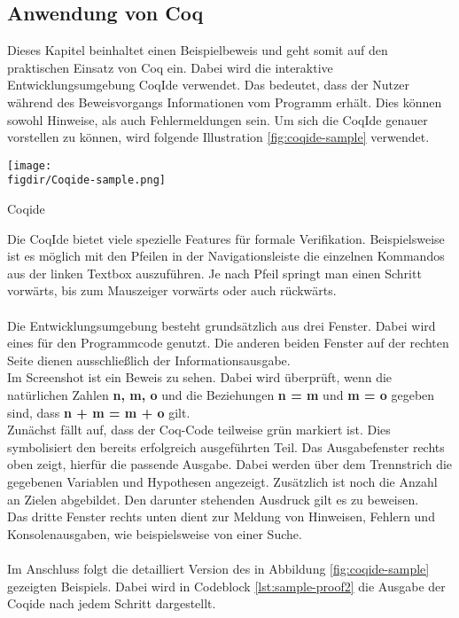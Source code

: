\subsection{Anwendung von Coq}
Dieses Kapitel beinhaltet einen Beispielbeweis und geht somit auf den praktischen Einsatz von Coq ein. Dabei wird die interaktive Entwicklungsumgebung CoqIde verwendet. Das bedeutet, dass der Nutzer während des Beweisvorgangs Informationen vom Programm erhält. Dies können sowohl Hinweise, als auch Fehlermeldungen sein. Um sich die CoqIde genauer vorstellen zu können, wird folgende Illustration \ref{fig:coqide-sample} verwendet.\\

\begin{minipage}{\textwidth}
	\centering
	\captionsetup{type=figure}
	\texttt{[image: \\figdir/Coqide-sample.png]}
	\caption{Coqide}
	\label{fig:coqide-sample}
\end{minipage}
Die CoqIde bietet viele spezielle Features für formale Verifikation. Beispielsweise ist es möglich mit den Pfeilen in der Navigationsleiste die einzelnen Kommandos aus der linken Textbox auszuführen. Je nach Pfeil springt man einen Schritt vorwärts, bis zum Mauszeiger vorwärts oder auch rückwärts.\\
\\
Die Entwicklungsumgebung besteht grundsätzlich aus drei Fenster. Dabei wird eines für den Programmcode genutzt. Die anderen beiden Fenster auf der rechten Seite dienen ausschließlich der Informationsausgabe.\\
Im Screenshot ist ein Beweis zu sehen. Dabei wird überprüft, wenn die natürlichen Zahlen \textbf{n, m, o} und die Beziehungen \textbf{n = m} und \textbf{m = o} gegeben sind, dass \textbf{n + m = m + o} gilt.\\
Zunächst fällt auf, dass der Coq-Code teilweise grün markiert ist. Dies symbolisiert den bereits erfolgreich ausgeführten Teil. Das Ausgabefenster rechts oben zeigt, hierfür die passende Ausgabe. Dabei werden über dem Trennstrich die gegebenen Variablen und Hypothesen angezeigt. Zusätzlich ist noch die Anzahl an Zielen abgebildet. Den darunter stehenden Ausdruck gilt es zu beweisen.\\
Das dritte Fenster rechts unten dient zur Meldung von Hinweisen, Fehlern und Konsolenausgaben, wie beispielsweise von einer Suche.\\
\\
Im Anschluss folgt die detailliert Version des in Abbildung \ref{fig:coqide-sample} gezeigten Beispiels. Dabei wird in Codeblock \ref{lst:sample-proof2} die Ausgabe der Coqide nach jedem Schritt dargestellt.
